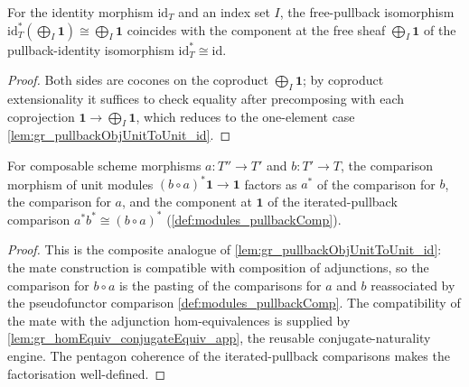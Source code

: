 \begin{lemma}
  \label{lem:gr_pullbackFreeIso_id}
  For the identity morphism \(\mathrm{id}_T\) and an index set \(I\), the free-pullback
  isomorphism \(\mathrm{id}_T^{*}(\bigoplus_I \mathbf 1) \cong \bigoplus_I \mathbf 1\) coincides
  with the component at the free sheaf \(\bigoplus_I \mathbf 1\) of the pullback-identity
  isomorphism \(\mathrm{id}_T^{*} \cong \mathrm{id}\).
\end{lemma}

\begin{proof}
  \leanok
  Both sides are cocones on the coproduct \(\bigoplus_I \mathbf 1\); by coproduct
  extensionality it suffices to check equality after precomposing with each coprojection
  \(\mathbf 1 \to \bigoplus_I \mathbf 1\), which reduces to the one-element case
  \cref{lem:gr_pullbackObjUnitToUnit_id}.
\end{proof}

\begin{lemma}
  \label{lem:gr_pullbackObjUnitToUnit_comp}
  For composable scheme morphisms \(a : T'' \to T'\) and \(b : T' \to T\), the comparison
  morphism of unit modules \((b \circ a)^{*}\mathbf{1} \to \mathbf{1}\) factors as
  \(a^{*}\) of the comparison for \(b\), the comparison for \(a\), and the component at
  \(\mathbf{1}\) of the iterated-pullback comparison \(a^{*}b^{*} \cong (b\circ a)^{*}\)
  (\cref{def:modules_pullbackComp}).
\end{lemma}

\begin{proof}
    \leanok
  This is the composite analogue of \cref{lem:gr_pullbackObjUnitToUnit_id}: the mate
  construction is compatible with composition of adjunctions, so the comparison for
  \(b \circ a\) is the pasting of the comparisons for \(a\) and \(b\) reassociated by the
  pseudofunctor comparison \cref{def:modules_pullbackComp}. The compatibility of the mate
  with the adjunction hom-equivalences is supplied by
  \cref{lem:gr_homEquiv_conjugateEquiv_app}, the reusable conjugate-naturality engine. The
  pentagon coherence of the iterated-pullback comparisons makes the factorisation
  well-defined.
\end{proof}

